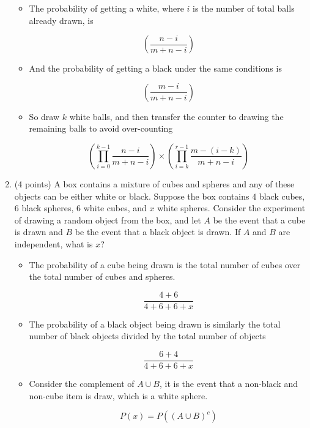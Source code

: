 \documentclass[11pt]{article}
\begin{document}
\begin{enumerate}
	\begin{itemize}
	
		\item The probability of getting a white, where $i$ is the number of total balls already drawn, is
		
			  \[ \left(\frac{n - i}{m + n - i}\right) \]
			  
		\item And the probability of getting a black under the same conditions is
		
			  \[ \left(\frac{m - i}{m + n - i}\right) \]
			  
		\item So draw $k$ white balls, and then transfer the counter to drawing the 
			  remaining balls to avoid over-counting
			  
			  \[ \left(\prod_{i = 0}^{k - 1} \frac{n - i}{m + n - i} \right) \times \left(\prod_{i = k}^{r - 1} \frac{m - (i - k)}{m + n - i} \right)\]
	
	\end{itemize}
	
	\item (4 points) A box contains a mixture of cubes and spheres and any of these
		  objects can be either white or black.  Suppose the box contains $4$ black
		  cubes, $6$ black spheres, $6$ white cubes, and $x$ white spheres.  Consider the
		  experiment of drawing a random object from the box, and let $A$ be the event
		  that a cube is drawn and $B$ be the event that a black object is drawn.
		  If $A$ and $B$ are independent, what is $x$?
	
	\begin{itemize}
	
		\item The probability of a cube being drawn is the total number of cubes over
			  the total number of cubes and spheres.
			  
			  \[ \frac{4 + 6}{4 + 6 + 6 + x} \]
			  
		\item The probability of a black object being drawn is similarly the total number
			  of black objects divided by the total number of objects
			  
			  \[\frac{6 + 4}{4 + 6 + 6 + x} \]
	
		\item Consider the complement of $A \cup B$, it is the event that a non-black
			  and non-cube item is draw, which is a white sphere.
			  
			  \[P(x) = P((A \cup B)^c) \]
	

\end{itemize}
\end{enumerate}
\end{document}
